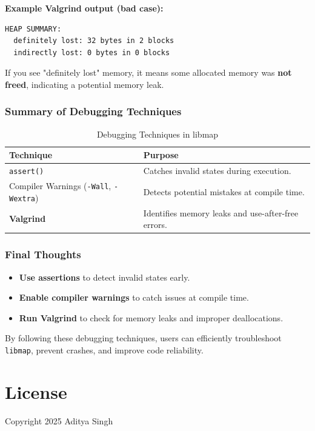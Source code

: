 \documentclass[titlepage]{article}
\begin{document}
\textbf{Example Valgrind output (bad case):}
\begin{verbatim}
HEAP SUMMARY:
  definitely lost: 32 bytes in 2 blocks
  indirectly lost: 0 bytes in 0 blocks
\end{verbatim}

If you see "definitely lost" memory, it means some allocated memory was \textbf{not freed}, indicating a potential memory leak.

\subsubsection{Summary of Debugging Techniques}

\begin{table}[h]
    \centering
    \renewcommand{\arraystretch}{1.3}
    \begin{tabular}{@{} l p{10cm} @{}}
        \toprule
        \textbf{Technique} & \textbf{Purpose} \\
        \midrule
        \texttt{assert()} & Catches invalid states during execution. \\
        Compiler Warnings (\texttt{-Wall}, \texttt{-Wextra}) & Detects potential mistakes at compile time. \\
        \textbf{Valgrind} & Identifies memory leaks and use-after-free errors. \\
        \bottomrule
    \end{tabular}
    \caption{Debugging Techniques in libmap}
\end{table}

\subsubsection{Final Thoughts}

\begin{itemize}
    \item \textbf{Use assertions} to detect invalid states early.
    \item \textbf{Enable compiler warnings} to catch issues at compile time.
    \item \textbf{Run Valgrind} to check for memory leaks and improper deallocations.
\end{itemize}

By following these debugging techniques, users can efficiently troubleshoot \texttt{libmap}, prevent crashes, and improve code reliability.


\newpage
\section{License}
Copyright 2025 Aditya Singh
\end{document}
